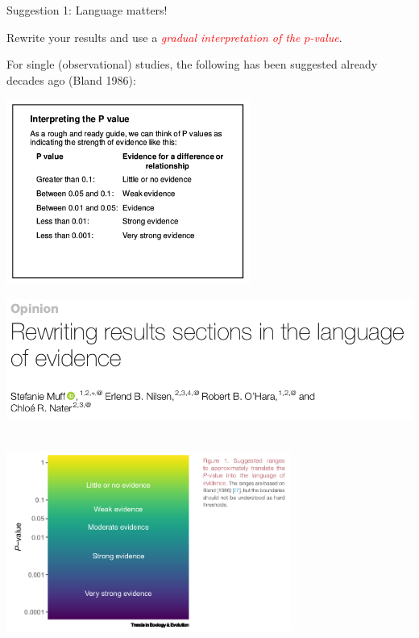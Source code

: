 \documentclass[
  10pt,
  ignorenonframetext,
]{beamer}
\begin{document}
\begin{frame}
\begin{block}{Suggestion 1: Language matters!}
\protect\hypertarget{suggestion-1-language-matters}{}
\vspace{2mm}

Rewrite your results and use a
\emph{\textcolor{red}{gradual interpretation of the $p$-value}}.

\vspace{2mm}

For single (observational) studies, the following has been suggested
already decades ago (Bland 1986):

\vspace{5mm}

\centering

\includegraphics[width=0.6\textwidth,height=\textheight]{graphics/JMBland.png}
\end{block}
\end{frame}

\begin{frame}
\includegraphics[width=1\textwidth,height=\textheight]{graphics/tree_title.png}
\(~\)

\centering

\includegraphics[width=0.7\textwidth,height=\textheight]{graphics/tree_figure.png}
\end{frame}
\end{document}
